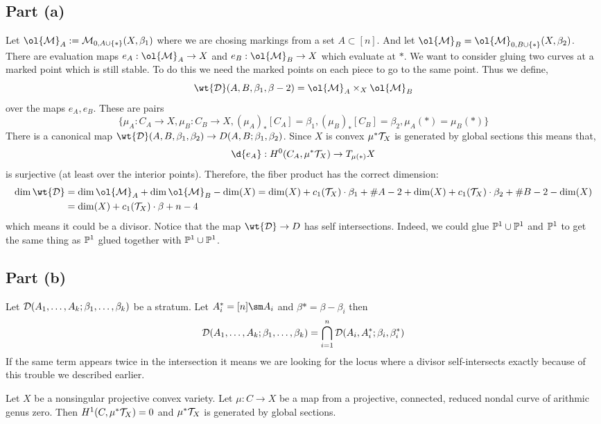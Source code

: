 \documentclass[12pt]{article}
\begin{document}
\subsection{Part (a)}

Let $\ol{\M}_{A} := \M_{0, A \cup \{ * \}}(X, \beta_1)$ where we are chosing markings from a set $A \subset [n]$. And let $\ol{\M}_{B} = \ol{\M}_{0, B \cup \{ * \}}(X, \beta_2)$. There are evaluation maps $e_A : \ol{\M}_{A} \to X$ and $e_B : \ol{\M}_B \to X$ which evaluate at $*$. We want to consider gluing two curves at a marked point which is still stable. To do this we need the marked points on each piece to go to the same point. Thus we define,
\[ \wt{\D}(A, B, \beta_1, \beta-2) = \ol{\M}_A \times_X \ol{\M}_B \]
over the maps $e_A, e_B$. These are pairs
\[ \{ \mu_A : C_A \to X, \mu_B : C_B \to X, (\mu_A)_* [C_A] = \beta_1, (\mu_B)_* [C_B] = \beta_2, \mu_A(*) = \mu_B(*) \} \]
There is a canonical map $\wt{\D}(A, B, \beta_1, \beta_2) \to D(A, B ; \beta_1, \beta_2)$. Since $X$ is convex $\mu^* \T_X$ is generated by global sections this means that,
\[ \d{e_A} : H^0(C_A, \mu^* \T_X) \to T_{\mu(*)} X \]
is surjective (at least over the interior points). Therefore, the fiber product has the correct dimension:
\begin{align*}
\dim{\wt{\D}} & = \dim{\ol{\M}_A} + \dim{\ol{\M}_B} - \dim(X) = \dim(X) + c_1(\T_X) \cdot \beta_1 + \# A - 2 + \dim(X) + c_1(\T_X) \cdot \beta_2 + \# B - 2 - \dim(X)
\\
& = \dim(X) + c_1(\T_X) \cdot \beta + n - 4 
\end{align*}
which means it could be a divisor. Notice that the map $\wt{\D} \to D$ has self intersections. Indeed, we could glue $\P^1 \cup \P^1$ and $\P^1$ to get the same thing as $\P^1$ glued together with $\P^1 \cup \P^1$. 

\subsection{Part (b)}

Let $\D(A_1, \dots, A_k ; \beta_1, \dots, \beta_k)$ be a stratum. Let $A_i^* = [n] \sm A_i$ and $\beta* = \beta - \beta_i$ then 
\[ \D(A_1, \dots, A_k ; \beta_1, \dots, \beta_k) = \bigcap_{i = 1}^n \D(A_i, A_i^* ; \beta_i, \beta_i^*) \]
If the same term appears twice in the intersection it means we are looking for the locus where a divisor self-intersects exactly because of this trouble we described earlier. 

\begin{lemma}
Let $X$ be a nonsingular projective convex variety. Let $\mu : C \to X$ be a map from a projective, connected, reduced nondal curve of arithmic genus zero. Then $H^1(C, \mu^* \T_X) = 0$ and $\mu^* \T_X$ is generated by global sections.
\end{lemma}
\end{document}
